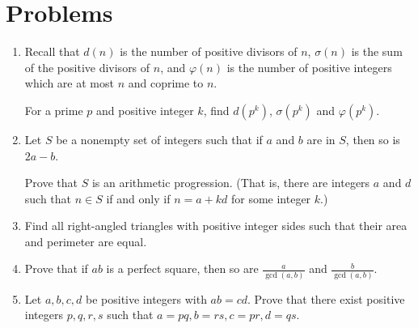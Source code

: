 \documentclass{article}
\begin{document}
\section{Problems}
\begin{enumerate}
  \item Recall that $d(n)$ is the number of positive divisors of $n$, $\sigma(n)$ is
    the sum of the positive divisors of $n$, and $\varphi(n)$ is the number of
    positive integers which are at most $n$ and coprime to $n$.

    For a prime $p$ and positive integer $k$, find $d(p^k)$, $\sigma(p^k)$ and
    $\varphi(p^k)$.
  \item Let $S$ be a nonempty set of integers such that if $a$ and $b$ are in $S$, then
    so is $2a-b$.

    Prove that $S$ is an arithmetic
    progression. (That is, there are integers $a$ and $d$ such that $n\in S$ if
    and only if 
    $n=a+kd$ for some integer $k$.)
  \item Find all right-angled triangles with positive integer sides 
      such that their area and perimeter are equal.
  \item Prove that if $ab$ is a perfect square, then so are $\frac a{\gcd(a,b)}$ and
      $\frac b{\gcd(a,b)}$.
  \item Let $a,b,c,d$ be positive integers with $ab=cd$. Prove that there
    exist positive integers $p,q,r,s$ such that \(a=pq,b=rs,c=pr,d=qs\).
\end{enumerate}
\newpage
\end{document}

